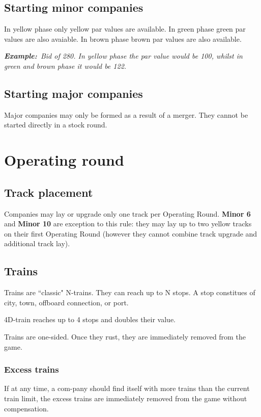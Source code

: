 \documentclass[10pt,a4paper,twocolumn]{article}
\newcommand{\Example}{\textbf{Example:}}
\begin{document}
\subsection{Starting minor companies}
In yellow phase only yellow par values are available. In green phase green par values are also avaiable. In brown phase brown par values are also available.

\textit{\Example~Bid of 280. In yellow phase the par value would be 100, whilst in green and brown phase it would be 122.}

\subsection{Starting major companies}
Major companies may only be formed as a result of a merger. They cannot be started directly in a stock round.


\section{Operating round}

\subsection{Track placement}
Companies may lay or upgrade only one track per Operating Round. \textbf{Minor 6} and \textbf{Minor 10} are exception to this rule: they may lay up to two yellow tracks on their first Operating Round (however they cannot combine track upgrade and additional track lay).


\subsection{Trains}
Trains are ``classic" N-trains. They can reach up to N stops. A stop constitues of city, town, offboard connection, or port.

4D-train reaches up to 4 stops and doubles their value.

Trains are one-sided. Once they rust, they are immediately removed from the game.

\subsubsection{Excess trains}

If at any time, a com-pany  should  find  itself with  more  trains  than  the  current train limit, the excess trains are immediately removed from the game  without  compensation.
\end{document}
